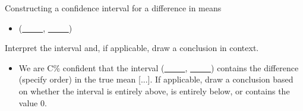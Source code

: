 \begin{onebox}{Constructing a confidence interval for a difference in means}
\begin{itemize}
\begin{itemize}
\item[] point estimate: $\bar{x}_1 - \bar{x}_2$, the difference in sample means 
\item[] $SE$ of estimate:  $\sqrt{\frac{s^2_1}{n_1}+\frac{s^2_2}{n_2}}$
\item[] $t^{\star}$: use technology or use a $t$-table at row $df$ and confidence level C\%
\end{itemize}
\item[] (\underline{\ \ \ \ \ }, \underline{\ \ \ \ \ })
\end{itemize}
  Interpret the interval and, if applicable, draw a conclusion in context.\vspace{-1mm}
\begin{itemize}
\item[] We are C\% confident that the interval (\underline{\ \ \ \ \ }, \underline{\ \ \ \ \ }) contains the difference (specify order) in the true mean [...].  If applicable, draw a conclusion based on whether the interval is entirely above, is entirely below, or contains the value 0. 
\end{itemize}\end{onebox}

